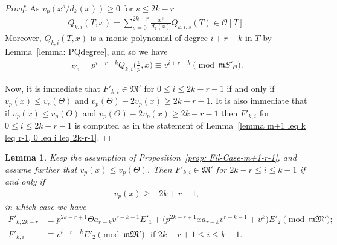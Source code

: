 \documentclass[11pt]{amsart}
\theoremstyle{definition}
\numberwithin{equation}{subsection}
\theoremstyle{plain}
\theoremstyle{plain}
\theoremstyle{plain}
\theoremstyle{plain}
\theoremstyle{plain}
\theoremstyle{plain}
\theoremstyle{plain}
\theoremstyle{plain}
\theoremstyle{plain}
\newtheorem{lemm}[equation]{Lemma}
\theoremstyle{plain}
\theoremstyle{plain}
\theoremstyle{plain}
\theoremstyle{definition}
\theoremstyle{definition}
\theoremstyle{definition}
\theoremstyle{remark}
\renewcommand{\(}{\textup{(}}
\renewcommand{\)}{\textup{)}}
\newcommand{\fM}{\mathfrak{M}}
\newcommand{\fm}{\mathfrak{m}}
\newcommand{\cO}{\mathcal{O}}
\newcommand{\barF}{\overline{F}}
\begin{document}
\begin{proof}
As $v_p(x^s/d_k(x))\geq 0$ for $s\leq 2k-r$
\begin{align*}
Q_{k,i}(T,x)=\sum_{s=0}^{2k-r}\frac{x^s}{d_k(x)}Q_{k,i,s}(T)
\in\cO[T].
\end{align*}
Moreover, $Q_{k,i}(T,x)$ is a monic polynomial of degree $i+r-k$ in $T$ by Lemma~\ref{lemma: PQdegree}, and so we have
\begin{align*}
    [F'_{k,i}]_{E'_2}
    =p^{i+r-k}Q_{k,i}\Big(\frac{v}{p},x\Big)
    \equiv v^{i+r-k} \pmod{\fm S'_\cO}.
\end{align*}


Now, it is immediate that $F'_{k,i}\in\fM'$ for $0\leq i\leq 2k-r-1$ if and only if $v_p(x)\leq v_p(\Theta)$ and $v_p(\Theta)-2v_p(x)\geq 2k-r-1$. It is also immediate that if $v_p(x)\leq v_p(\Theta)$ and $v_p(\Theta)-2v_p(x)\geq 2k-r-1$ then $\barF'_{k,i}$ for $0\leq i\leq 2k-r-1$ is computed as in the statement of Lemma~\ref{lemma m+1 leq k leq r-1, 0 leq i leq 2k-r-1}.
\end{proof}





\begin{lemm}\label{lemma m+1 leq k leq r-1, 2k-r leq i leq k-1}
Keep the assumption of Proposition~\ref{prop: Fil-Case-m+1-r-1}, and assume further that $v_p(x)\leq v_p(\Theta)$. Then $F'_{k,i}\in\fM'$ for $2k-r\leq i\leq k-1$ if and only if
\begin{align*}
    v_p(x)\geq -2k+r-1,
\end{align*}
in which case we have
\begin{align*}
F'_{k,2k-r} &\equiv  p^{2k-r+1}\Theta a_{r-k}v^{r-k-1}E'_1 +\big(p^{2k-r+1}xa_{r-k}v^{r-k-1}+v^k\big)E'_2 \pmod{\fm\fM'};\\
F'_{k,i} &\equiv v^{i+r-k}E'_2 \pmod{\fm\fM'}\,\,\mbox{ if }2k-r+1\leq i\leq k-1.
\end{align*}
\end{lemm}
\end{document}
